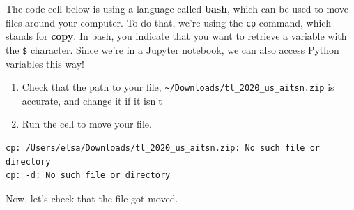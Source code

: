 \documentclass[
  letterpaper,
  DIV=11,
  numbers=noendperiod,
  oneside]{scrreprt}
\newenvironment{Shaded}{\begin{snugshade}}{\end{snugshade}}
\newcommand{\BuiltInTok}[1]{\textcolor[rgb]{0.00,0.23,0.31}{#1}}
\newcommand{\NormalTok}[1]{\textcolor[rgb]{0.00,0.23,0.31}{#1}}
\newcommand{\OperatorTok}[1]{\textcolor[rgb]{0.37,0.37,0.37}{#1}}
\newcommand{\StringTok}[1]{\textcolor[rgb]{0.13,0.47,0.30}{#1}}
\providecommand{\tightlist}{%
  \setlength{\itemsep}{0pt}\setlength{\parskip}{0pt}}
\begin{document}
\begin{tcolorbox}[enhanced jigsaw, colbacktitle=quarto-callout-color!10!white, opacityback=0, bottomtitle=1mm, toptitle=1mm, bottomrule=.15mm, left=2mm, colframe=quarto-callout-color-frame, leftrule=.75mm, opacitybacktitle=0.6, colback=white, rightrule=.15mm, toprule=.15mm, breakable, titlerule=0mm, title=\textcolor{quarto-callout-color}{\faInfo}\hspace{0.5em}{Try It}, coltitle=black, arc=.35mm]

The code cell below is using a language called \textbf{bash}, which can
be used to move files around your computer. To do that, we're using the
\texttt{cp} command, which stands for \textbf{copy}. In bash, you
indicate that you want to retrieve a variable with the \texttt{\$}
character. Since we're in a Jupyter notebook, we can also access Python
variables this way!

\begin{enumerate}
\def\labelenumi{\arabic{enumi}.}
\tightlist
\item
  Check that the path to your file,
  \texttt{\textasciitilde{}/Downloads/tl\_2020\_us\_aitsn.zip} is
  accurate, and change it if it isn't
\item
  Run the cell to move your file.
\end{enumerate}

\end{tcolorbox}

\begin{Shaded}
\end{Shaded}

\begin{verbatim}
cp: /Users/elsa/Downloads/tl_2020_us_aitsn.zip: No such file or directory
cp: -d: No such file or directory
\end{verbatim}

Now, let's check that the file got moved.

\begin{Shaded}
\end{Shaded}
\end{document}

